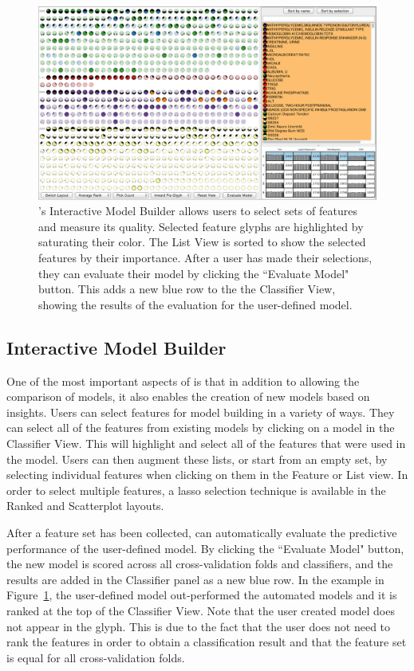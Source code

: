 \begin{figure}[ht]
\centering
\includegraphics[width=\linewidth]{infuse/selection}
\caption{
\infuse's Interactive Model Builder allows users to select sets of features and measure its quality.
Selected feature glyphs are highlighted by saturating their color.  The List View is sorted to show the selected features by their importance.  After a user has made their selections, they can evaluate their model by clicking the ``Evaluate Model" button.  This adds a new blue row to the the Classifier View, showing the results of the evaluation for the user-defined model.
}
\label{fig:selection}
\end{figure}

\subsection{Interactive Model Builder}
\label{sec:imb}

One of the most important aspects of \infuse is that in addition to allowing the comparison of models, it also enables the creation of new models based on insights.
Users can select features for model building in a variety of ways.  They can select all of the features from existing models by clicking on a model in the Classifier View.  This will highlight and select all of the features that were used in the model.  Users can then augment these lists, or start from an empty set, by selecting individual features when clicking on them in the Feature or List view.  In order to select multiple features, a lasso selection technique is available in the Ranked and Scatterplot layouts.

After a feature set has been collected, \infuse can automatically evaluate the predictive performance of the user-defined model. By clicking the ``Evaluate Model" button,
the new model is scored across all cross-validation folds and classifiers, and the results are added in the Classifier panel as a new blue row.  In the example in Figure~\ref{fig:selection}, the user-defined model out-performed the automated models and it is ranked at the top of the Classifier View.
Note that the user created model does not appear in the glyph.
This is due to the fact that the user does not need to rank the
features in order to obtain a classification result and that the feature
set is equal for all cross-validation folds.

